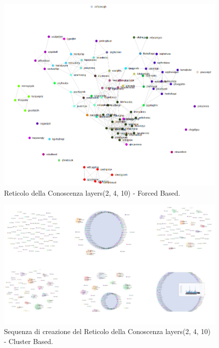 \begin{figure}[H]
\centering
	\includegraphics[width=0.70\linewidth]{./image/logica(2,4,10)_forced.png}
	\caption{Reticolo della Conoscenza layers(2, 4, 10) - Forced Based.}
	\label{Reticolo della Conoscenza layers(2, 4, 10)) - Forced Based.}
\end{figure}
\noindent

\begin{figure}[H]
\centering
	\includegraphics[width=0.70\linewidth]{./image/collage_reticolo-logica(2,4,10).png}
	\caption{Sequenza di creazione del Reticolo della Conoscenza layers(2, 4, 10) - Cluster Based.}
	\label{Sequenza di creazione del Reticolo della Conoscenza layers(2, 4, 10) - Cluster Based.}
\end{figure}
\noindent

